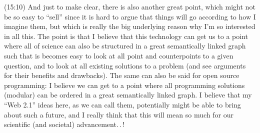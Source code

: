 \documentclass{report}
\begin{document}
(15:10) And just to make clear, there is also another great point, which might not be so easy to ``sell'' since it is hard to argue that things will go according to how I imagine them, but which is really the big underlying reason why I'm so interested in all this. The point is that I believe that this technology can get us to a point where all of science can also be structured in a great semantically linked graph such that is becomes easy to look at all point and counterpoints to a given question, and to look at all existing solutions to a problem (and see arguments for their benefits and drawbacks). The same can also be said for open source programming: I believe we can get to a point where all programming solutions (modular) can be ordered in a great semantically linked graph. I believe that my ``Web 2.1'' ideas here, as we can call them, potentially might be able to bring about such a future, and I really think that this will mean so much for our scientific (and societal) advancement.\,.\,! %
\end{document}
